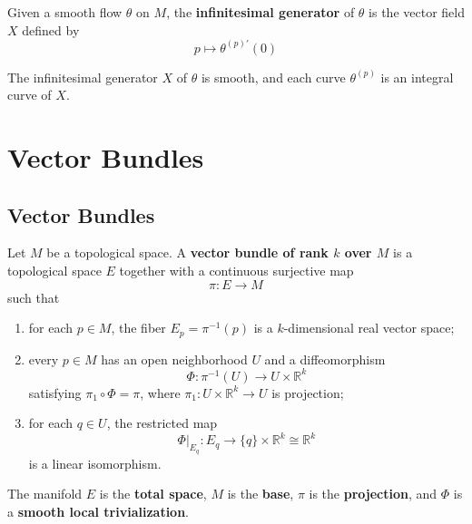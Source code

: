 \documentclass[12pt, oneside]{book}
\begin{document}
\begin{definition}
    Given a smooth flow $\theta$ on $M$, the \textbf{infinitesimal generator} of $\theta$ is the vector field $X$ defined by
    \begin{equation*}
        p\mapsto \theta^{(p)\prime}(0)
    \end{equation*}
\end{definition}

\begin{proposition}
    The infinitesimal generator $X$ of $\theta$ is smooth, and
    each curve $\theta^{(p)}$ is an integral curve of $X$.
\end{proposition}


\begin{theorem}

\end{theorem}








\chapter{Vector Bundles}

\section{Vector Bundles}

\begin{definition}
    Let $M$ be a topological space. A \textbf{vector bundle of rank $k$ over $M$} is a topological space $E$ together with a continuous surjective map
    \[
        \pi:E\rightarrow M
    \]
    such that
    \begin{enumerate}[label=(\roman*)]
        \item for each $p\in M$, the fiber $E_p=\pi^{-1}(p)$ is a $k$-dimensional real vector space;
        \item every $p\in M$ has an open neighborhood $U$ and a diffeomorphism
              \[
                  \Phi:\pi^{-1}(U)\rightarrow U\times \mathbb{R}^k
              \]
              satisfying $\pi_1\circ\Phi=\pi$, where $\pi_1:U\times\mathbb{R}^k\rightarrow U$ is projection;
        \item for each $q\in U$, the restricted map
              \[
                  \Phi|_{E_q}:E_q\rightarrow \{q\}\times \mathbb{R}^k\cong \mathbb{R}^k
              \]
              is a linear isomorphism.
    \end{enumerate}
    The manifold $E$ is the \textbf{total space}, $M$ is the \textbf{base}, $\pi$ is the \textbf{projection}, and $\Phi$ is a \textbf{smooth local trivialization}.
\end{definition}
\end{document}
